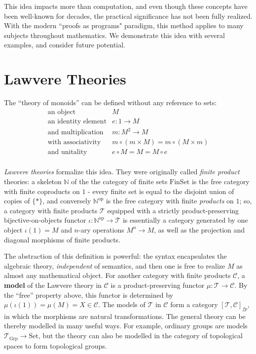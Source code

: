 \documentclass[a4paper,UKenglish]{article}
\theoremstyle{definition}
\newcommand{\Set}{\mathrm{Set}}
\newcommand{\Grp}{\mathrm{Grp}}
\newcommand{\FinSet}{\mathrm{FinSet}}
\newcommand{\op}{\mathrm{op}}
\newcommand{\NN}{\mathbb{N}}
\newcommand{\C}{\mathscr{C}}
\newcommand{\T}{\mathscr{T}}
\begin{document}
This idea impacts more than computation, and even though these concepts have been well-known for decades, the practical significance has not been fully realized. With the modern ``proofs as programs" paradigm, this method applies to many subjects throughout mathematics. We demonstrate this idea with several examples, and consider future potential.

\section{Lawvere Theories}
The ``theory of monoids'' can be defined without any reference to sets:
\[\begin{array}{rl}
\text{an object} & M\\
\text{an identity element} & e:1 \to M\\
\text{and multiplication} & m: M^2 \to M\\
\text{with associativity} & m \circ (m \times M) = m \circ (M \times m)\\
\text{and unitality} & e \circ M = M = M \circ e\\
\end{array}\]

\textit{Lawvere theories} formalize this idea. They were originally called \textit{finite product} theories: a skeleton $\NN$ of the the category of finite sets $\FinSet$ is the free category with finite coproducts on $1$ - every finite set is equal to the disjoint union of copies of $\{*\}$, and conversely $\NN^\op$ is the free category with finite \textit{products} on $1$; so, a category with finite products $\T$ equipped with a strictly product-preserving bijective-on-objects functor $\iota:\NN^\op \to \T$ is essentially a category generated by one object $\iota(1) = M$ and $n$-ary operations $M^n \to M$, as well as the projection and diagonal morphisms of finite products.

The abstraction of this definition is powerful: the syntax encapsulates the algebraic theory, \textit{independent} of semantics, and then one is free to realize $M$ as almost any mathematical object. For another category with finite products $\C$, a \textbf{model} of the Lawvere theory in $\C$ is a product-preserving functor $\mu: \T \to \C$. By the ``free'' property above, this functor is determined by $\mu(\iota(1)) = \mu(M) = X \in \C$. The models of $\T$ in $\C$ form a category $[\T,\C]_{fp}$, in which the morphisms are natural transformations. The general theory can be thereby modelled in many useful ways. For example, ordinary groups are models $\T_\Grp \to \Set$, but the theory can also be modelled in the category of topological spaces to form topological groups.
\end{document}
